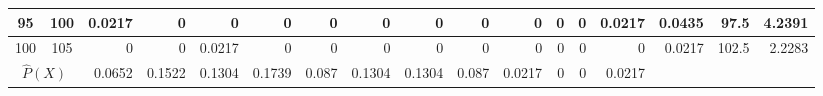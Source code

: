 \begin{table}[ht]
\begin{adjustbox}{width = \textwidth, center}
\begin{tabular}{|cc|r|r|r|r|r|r|r|r|r|r|r|r|r|r|r|}
            \rowcolor[HTML]{FFFFFF} 
            \cellcolor[HTML]{C8E4BE}95             & \cellcolor[HTML]{D9EAD3}100            & \cellcolor[HTML]{C7E9D8}0.0217                 & 0                                              & 0                                              & 0                                              & 0                                              & 0                                              & 0                                              & 0                                               & 0                                               & 0                                               & 0                                               & \cellcolor[HTML]{C7E9D8}0.0217                  & \cellcolor[HTML]{D9D2E9}0.0435                                                  & \cellcolor[HTML]{D9D2E9}97.5                                            & \cellcolor[HTML]{D9D2E9}4.2391                                                                   \\ \hline
            \rowcolor[HTML]{FFFFFF} 
            \cellcolor[HTML]{C8E4BE}100            & \cellcolor[HTML]{D9EAD3}105            & 0                                              & 0                                              & \cellcolor[HTML]{C7E9D8}0.0217                 & 0                                              & 0                                              & 0                                              & 0                                              & 0                                               & 0                                               & 0                                               & 0                                               & 0                                               & \cellcolor[HTML]{D9D2E9}0.0217                                                  & \cellcolor[HTML]{D9D2E9}102.5                                           & \cellcolor[HTML]{D9D2E9}2.2283                                                                   \\ \hline
            \multicolumn{2}{|c|}{\cellcolor[HTML]{FCE5CD}$\widehat{P}(X)$}                  & \cellcolor[HTML]{FCE5CD}0.0652                 & \cellcolor[HTML]{FCE5CD}0.1522                 & \cellcolor[HTML]{FCE5CD}0.1304                 & \cellcolor[HTML]{FCE5CD}0.1739                 & \cellcolor[HTML]{FCE5CD}0.087                  & \cellcolor[HTML]{FCE5CD}0.1304                 & \cellcolor[HTML]{FCE5CD}0.1304                 & \cellcolor[HTML]{FCE5CD}0.087                   & \cellcolor[HTML]{FCE5CD}0.0217                  & \cellcolor[HTML]{FCE5CD}0                       & \cellcolor[HTML]{FCE5CD}0                       & \cellcolor[HTML]{FCE5CD}0.0217                  & \multicolumn{1}{l|}{}                                                           & \multicolumn{1}{l|}{}                                                   & \multicolumn{1}{l|}{}                                                                            \\ \hline

\end{tabular}
\end{adjustbox}
\end{table}
